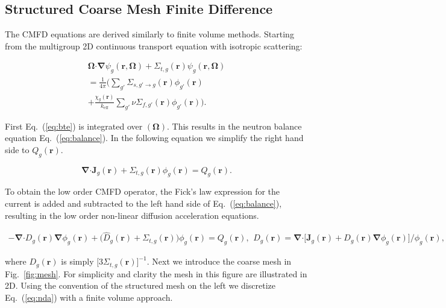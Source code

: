 \documentclass{anstrans}
\renewcommand{\vec}[1]{\bm{#1}}       %
\newcommand{\vd}{\bm{\cdot}}          %
\newcommand{\grad}{\vec{\nabla}}      %
\newcommand{\vr}{\vec{r}}             %
\newcommand{\vOmega}{\vec{\Omega}}    %
\newcommand{\vJ}{\vec{J}}             %
\renewcommand{\eqref}[1]{Eq.~(\ref{#1})}
\newcommand{\figref}[1]{Fig.~\ref{#1}}
\begin{document}
\subsection{Structured Coarse Mesh Finite Difference} \label{subsec:sCMFD}
The CMFD equations are derived similarly to finite volume methods. Starting from the multigroup 2D continuous transport equation with isotropic scattering:

\begin{multline} \label{eq:bte}
  \vOmega \vd \grad \psi_g(\vr,\vOmega) + \Sigma_{t,g}(\vr) \psi_g(\vr,\vOmega)
\\ =
  \frac{1}{4\pi} \bigg(\sum_{g'} \Sigma_{s,g' \rightarrow g}(\vr) \phi_{g'}(\vr)
\\  + \frac{\chi_g(\vr)}{k_{\text{eff}}} \sum_{g'} \nu\Sigma_{f,g'}(\vr)\phi_{g'}(\vr) \bigg) .
\end{multline}

First \eqref{eq:bte} is integrated over $(\vOmega)$. This results in the neutron balance equation \eqref{eq:balance}. In the following equation we simplify the right hand side to $Q_g(\vr)$.

\begin{equation} \label{eq:balance}
    \grad \vd \vJ_g(\vr) + \Sigma_{t,g}(\vr) \phi_g(\vr) = Q_g(\vr) .
\end{equation}

To obtain the low order CMFD operator, the Fick's law expression for the current is added and subtracted to the left hand side of \eqref{eq:balance}, resulting in the low order non-linear diffusion acceleration equations.

\begin{subequations} \label{eq:nda}
    \begin{multline}
        -\grad \vd D_g(\vr)  \grad\phi_g(\vr)
    + \bigg(\hat{D}_g(\vr) + \Sigma_{t,g}(\vr)\bigg) \phi_g(\vr) = Q_g(\vr) ,
    \end{multline}
    \begin{equation} \label{eq:dhatdef}
        \hat{D}_{g}(\vr) = \grad \vd \Bigg[ \vJ_g(\vr) + D_g(\vr)  \grad\phi_g(\vr)
        \Bigg] \Bigg/ \phi_g(\vr) ,
    \end{equation}
\end{subequations}

\noindent where $D_g(\vr)$ is simply $\big[3\Sigma_{t,g}(\vr)\big]^{-1}$. Next we introduce the coarse mesh in \figref{fig:mesh}. For simplicity and clarity the mesh in this figure are illustrated in 2D. Using the convention of the structured mesh on the left we discretize \eqref{eq:nda} with a finite volume approach. 
\end{document}
